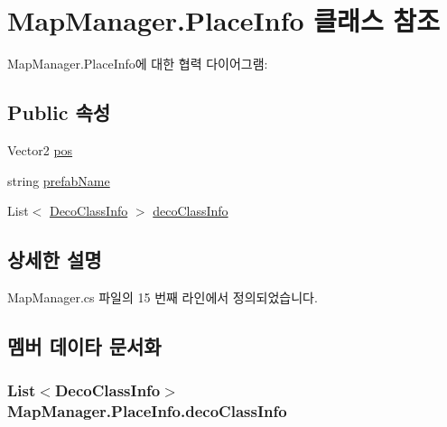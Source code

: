 \hypertarget{class_map_manager_1_1_place_info}{}\section{Map\+Manager.\+Place\+Info 클래스 참조}
\label{class_map_manager_1_1_place_info}


Map\+Manager.\+Place\+Info에 대한 협력 다이어그램\+:
\subsection*{Public 속성}
\begin{DoxyCompactItemize}
\item 
Vector2 \hyperlink{class_map_manager_1_1_place_info_a892976a463c8f25b15b248220f10289e}{pos}
\item 
string \hyperlink{class_map_manager_1_1_place_info_a82ac5b1455ed7b78f7338784ac91fe1b}{prefab\+Name}
\item 
List$<$ \hyperlink{class_map_manager_1_1_deco_class_info}{Deco\+Class\+Info} $>$ \hyperlink{class_map_manager_1_1_place_info_a66fc5e48eee892ff19c2b4c4cd7661c7}{deco\+Class\+Info}
\end{DoxyCompactItemize}


\subsection{상세한 설명}


Map\+Manager.\+cs 파일의 15 번째 라인에서 정의되었습니다.



\subsection{멤버 데이타 문서화}
\subsubsection[{\texorpdfstring{deco\+Class\+Info}{decoClassInfo}}]{\setlength{\rightskip}{0pt plus 5cm}List$<${\bf Deco\+Class\+Info}$>$ Map\+Manager.\+Place\+Info.\+deco\+Class\+Info}\hypertarget{class_map_manager_1_1_place_info_a66fc5e48eee892ff19c2b4c4cd7661c7}{}\label{class_map_manager_1_1_place_info_a66fc5e48eee892ff19c2b4c4cd7661c7}


